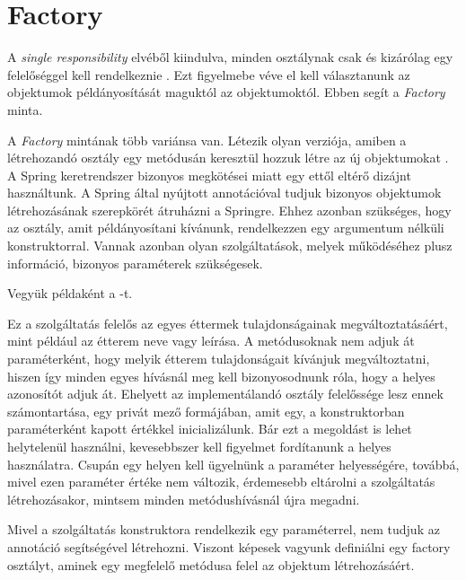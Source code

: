 \section{Factory}

A \emph{single responsibility} elvéből kiindulva, minden osztálynak csak és kizárólag egy felelőséggel kell rendelkeznie \cite{martin2003agile}. Ezt figyelmebe véve el kell választanunk az objektumok példányosítását maguktól az objektumoktól. Ebben segít a \emph{Factory} minta. \par

A \emph{Factory} mintának több variánsa van. Létezik olyan verziója, amiben a létrehozandó osztály egy metódusán keresztül hozzuk létre az új objektumokat \cite{gamma1995elements}. A Spring keretrendszer bizonyos megkötései miatt egy ettől eltérő dizájnt használtunk. A Spring által nyújtott  annotációval tudjuk bizonyos objektumok létrehozásának szerepkörét átruházni a Springre. Ehhez azonban szükséges, hogy az osztály, amit példányosítani kívánunk, rendelkezzen egy argumentum nélküli konstruktorral. Vannak azonban olyan szolgáltatások, melyek működéséhez plusz információ, bizonyos paraméterek szükségesek. \par

Vegyük példaként a -t.


Ez a szolgáltatás felelős az egyes éttermek tulajdonságainak megváltoztatásáért, mint például az étterem neve vagy leírása. A metódusoknak nem adjuk át paraméterként, hogy melyik étterem tulajdonságait kívánjuk megváltoztatni, hiszen így minden egyes hívásnál meg kell bizonyosodnunk róla, hogy a helyes azonosítót adjuk át. Ehelyett az implementálandó osztály felelőssége lesz ennek számontartása, egy privát mező formájában, amit egy, a konstruktorban paraméterként kapott értékkel inicializálunk. Bár ezt a megoldást is lehet helytelenül használni, kevesebbszer kell figyelmet fordítanunk a helyes használatra. Csupán egy helyen kell ügyelnünk a paraméter helyességére, továbbá, mivel ezen paraméter értéke nem változik, érdemesebb eltárolni a szolgáltatás létrehozásakor, mintsem minden metódushívásnál újra megadni. \par

Mivel a szolgáltatás konstruktora rendelkezik egy paraméterrel, nem tudjuk az  annotáció segítségével létrehozni. Viszont képesek vagyunk definiálni egy factory osztályt, aminek egy megfelelő metódusa felel az objektum létrehozásáért. \par

